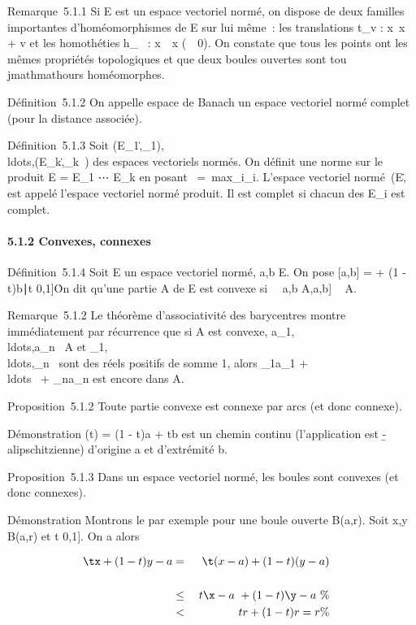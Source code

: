 \documentclass[]{article}
\begin{document}
Remarque~5.1.1 Si E est un espace vectoriel normé, on dispose de deux
familles importantes d'homéomorphismes de E sur lui même~: les
translations t_v : x\mapsto~x + v et les
homothéties h_\lambda~ : x\mapsto~\lambda~x
(\lambda~\neq~0). On constate que tous les points ont
les mêmes propriétés topologiques et que deux boules ouvertes sont
tou\\jmathmathours homéomorphes.

Définition~5.1.2 On appelle espace de Banach un espace vectoriel normé
complet (pour la distance associée).

Définition~5.1.3 Soit
(E_1,\._1),\\ldots,(E_k,\._k~)
des espaces vectoriels normés. On définit une norme sur le produit E =
E_1 \times⋯ \times E_k en posant
\x\
=\
max\x_i_i.
L'espace vectoriel
normé~(E,\.\) est
appelé l'espace vectoriel normé produit. Il est complet si chacun des
E_i est complet.

\paragraph{5.1.2 Convexes, connexes}

Définition~5.1.4 Soit E un espace vectoriel normé, a,b \in E. On pose
{[}a,b{]} = \ta + (1 - t)b∣t
\in {[}0,1{]}\. On dit qu'une partie A de E est convexe
si \forall~~a,b \in A,\quad {[}a,b{]} \subset~
A.

Remarque~5.1.2 Le théorème d'associativité des barycentres montre
immédiatement par récurrence que si A est convexe,
a_1,\\ldots,a_n~
\in A et
\lambda_1,\\ldots,\lambda_n~
sont des réels positifs de somme 1, alors \lambda_1a_1 +
\\ldots~ +
\lambda_na_n est encore dans A.

Proposition~5.1.2 Toute partie convexe est connexe par arcs (et donc
connexe).

Démonstration \gamma(t) = (1 - t)a + tb est un chemin continu (l'application
est \b -
a\-lipschitzienne) d'origine a et d'extrémité
b.

Proposition~5.1.3 Dans un espace vectoriel normé, les boules sont
convexes (et donc connexes).

Démonstration Montrons le par exemple pour une boule ouverte B(a,r).
Soit x,y \in B(a,r) et t \in {[}0,1{]}. On a alors

\begin{align*} \tx + (1 -
t)y - a& =& \t(x -
a) + (1 - t)(y - a)\\%
\\ & \leq& t\x -
a\ + (1 - t)\y -
a\ \%& \\ &
\textless{}& tr + (1 - t)r = r \%& \\
\end{align*}
\end{document}
